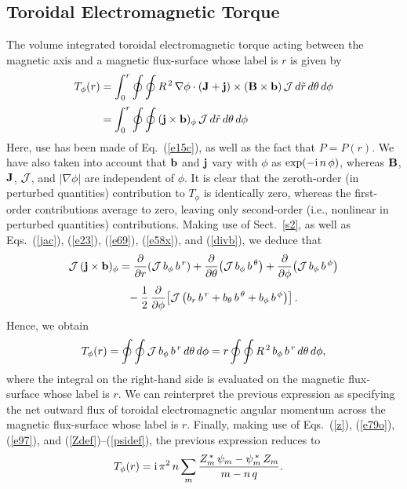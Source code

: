 \documentclass[12pt,prb,aps]{revtex4-1}
\begin{document}
\subsection{Toroidal Electromagnetic Torque}
The volume integrated toroidal electromagnetic torque acting between the magnetic axis and a magnetic flux-surface whose label is $r$ is given by
\begin{align}
T_\phi(r) &=\int_0^r\oint\oint R^{\,2}\,\nabla\phi\cdot({\bf J}+{\bf j})\times ({\bf B}\times {\bf b})\,{\cal J}\,d\tilde{r}\,d\theta\,d\phi\nonumber\\[0.5ex]
&=
\int_0^r\oint\oint\,  ({\bf j}\times {\bf b})_\phi\,{\cal J}\,d\tilde{r}\,d\theta\,d\phi
\end{align}
Here, use has been made of Eq.~(\ref{e15c}), as well as the fact that $P=P(r)$. We have also taken into account that ${\bf b}$ and ${\bf j}$ vary with $\phi$ as
$\exp(-{\rm i}\,n\,\phi)$, whereas ${\bf B}$, ${\bf J}$, ${\cal J}$, and $|\nabla\phi|$ are independent of $\phi$. It is clear that the zeroth-order (in perturbed quantities) contribution
to $T_\phi$ is identically zero, whereas the first-order contributions average to zero, leaving only second-order (i.e., nonlinear in perturbed quantities) contributions. 
Making use of Sect.~\ref{s2}, as well as Eqs.~(\ref{jac}), (\ref{e23}), (\ref{e69}), (\ref{e58x}), and (\ref{divb}), we deduce that
\begin{align}
{\cal J}\,({\bf j}\times {\bf b})_\phi&=\frac{\partial}{\partial r}\!\left({\cal J}\,b_\phi\,b^{\,r}\right)+\frac{\partial}{\partial\theta}\!\left({\cal J}\,b_\phi\,b^{\,\theta}\right)+\frac{\partial}{\partial \phi}\!\left({\cal J}\,b_\phi\,b^{\,\phi}\right)\nonumber\\[0.5ex]
&\phantom{=}-\frac{1}{2}\,\frac{\partial}{\partial\phi}\!\left[{\cal J}\left(b_r\,b^{\,r} + b_\theta\,b^{\,\theta}+b_\phi\,b^{\,\phi}\right)\right].
\end{align}
Hence, we obtain 
\begin{equation}\label{torque}
T_\phi(r)=\oint\oint {\cal J}\,b_\phi\,b^{\,r}\,d\theta\,d\phi=  r\oint\oint R^{\,2}\,b_\phi\,b^{\,r}\,d\theta\,d\phi,
\end{equation}
where the integral on the right-hand side is evaluated on the magnetic flux-surface whose label is $r$. We can reinterpret the
previous expression as specifying the net outward flux of toroidal electromagnetic angular momentum across the magnetic flux-surface whose label is $r$. 
Finally, making use of Eqs.~(\ref{z}), (\ref{e79o}), (\ref{e97}), and (\ref{Zdef})--(\ref{psidef}), the previous expression reduces to\,\cite{am1}
\begin{align}\label{etorque}
T_\phi(r) &= {\rm i}\,\pi^2\,n\sum_{m}\frac{Z_m^{\,\ast}\,\psi_m-\psi_m^{\,\ast}\,Z_m}{m-n\,q}.
\end{align}
 
\end{document}
